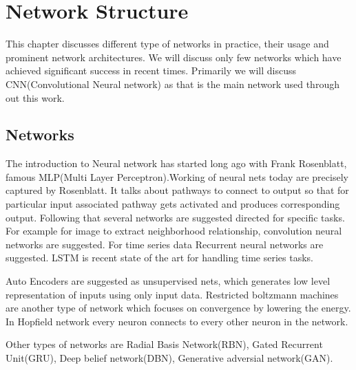 

\chapter{Network Structure}\label{chap:nwstruct}

This chapter discusses different type of networks in practice, their usage and prominent network architectures. We will discuss only few networks which have achieved significant success in recent times. Primarily we will discuss CNN(Convolutional Neural network) as that is the main network used through out this work.

\section{Networks}
The introduction to Neural network has started long ago with Frank Rosenblatt, famous MLP(Multi Layer Perceptron)\cite{Rosenblatt58theperceptron:}.Working of neural nets today are precisely captured by Rosenblatt.
It talks about pathways to connect to output so that for particular input associated pathway gets activated and produces corresponding output.
Following that several networks are suggested directed for specific tasks. For example for image to extract neighborhood relationship, convolution neural networks are suggested. For time series data Recurrent neural networks are suggested. LSTM is recent state of the art for handling time series tasks.

Auto Encoders are suggested as unsupervised nets, which generates low level representation of inputs using only input data. 
Restricted boltzmann machines are another type of network which focuses on convergence by lowering the energy.
In Hopfield network every neuron connects to every other neuron in the network.

Other types of networks are Radial Basis Network(RBN), Gated Recurrent Unit(GRU), Deep belief network(DBN), Generative adversial network(GAN).


